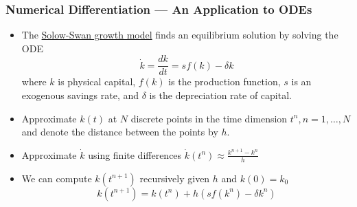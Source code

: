 \documentclass[11pt,xcolor={svgnames},aspectratio=169,usepdftitle=false,notheorems]{beamer}
\begin{document}
\begin{frame}
  \frametitle{Numerical Differentiation --- An Application to ODEs}
\begin{itemize}
  \item The \href{https://en.wikipedia.org/wiki/Solow–Swan_model}{Solow-Swan growth model} finds an equilibrium solution by solving the ODE
  \begin{equation}
    \dot{k} = \frac{dk}{dt} = s f(k) - \delta k
    \label{eqn:solow_capital}
  \end{equation}
  where $k$ is physical capital, $f(k)$ is the production function, $s$ is an exogenous savings rate, and $\delta$ is the depreciation rate of capital.
  \item Approximate $k(t)$ at $N$ discrete points in the time dimension $t^n, n = 1,\ldots, N$ and denote the distance between the points by $h$.
  \item Approximate $\dot{k}$ using finite differences $\dot{k}(t^n) \approx \frac{k^{n+1} - k^n}{h}$
  \item We can compute $k(t^{n+1})$ recursively given $h$ and $k(0) = k_0$ 
  \[
  k(t^{n+1}) = k(t^{n}) + h \left(s f(k^n) - \delta k^n\right)
  \]
\end{itemize}
\end{frame}
\end{document}
